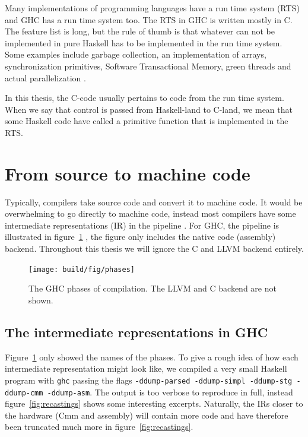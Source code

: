 Many implementations of programming languages have a run time system
(RTS) and GHC has a run time system too. The RTS in GHC is written
mostly in C. The feature list is long, but the rule of thumb is that
whatever can not be implemented in pure Haskell has to be implemented
in the run time system. Some examples include garbage collection,
an implementation of arrays, synchronization primitives, Software
Transactional Memory, green threads and actual parallelization
\cite{commentary_rts}.

In this thesis, the C-code usually pertains to code from the run time
system. When we say that control is passed from Haskell-land to C-land,
we mean that some Haskell code have called a primitive function that is
implemented in the RTS.

\section{From source to machine code}

Typically, compilers take source code and convert it to machine code.
It would be overwhelming to go directly to machine code, instead most
compilers have some intermediate representations (IR) in the pipeline \cite[p.358]{aho2007compilers}.  For GHC, the pipeline is illustrated in
figure~\ref{fig:ghc_phases} \cite{terei2009low}, the figure only
includes the native code (assembly) backend. Throughout this thesis we will ignore the
C and LLVM backend entirely.

\begin{figure}
\begin{mdframed}
  \centering
  \texttt{[image: build/fig/phases]}
  \caption{The GHC phases of compilation. The LLVM and C backend are not
    shown.}\label{fig:ghc_phases}
\end{mdframed}
\end{figure}

\subsection{The intermediate representations in GHC}

Figure~\ref{fig:ghc_phases} only showed the names of the phases. To
give a rough idea of how each intermediate representation might look
like, we compiled a very small Haskell program with \texttt{ghc} passing
the flags \texttt{-ddump-parsed -ddump-simpl -ddump-stg
-ddump-cmm -ddump-asm}. The output is too verbose to reproduce in
full, instead figure~\ref{fig:recastings} shows some interesting excerpts. Naturally, the
IRs closer to the hardware (Cmm and assembly) will contain more
code and have therefore been truncated much more in figure~\ref{fig:recastings}.

